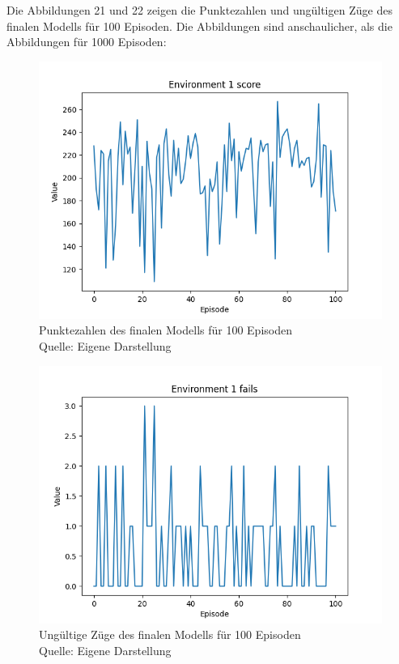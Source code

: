Die Abbildungen 21 und 22 zeigen die Punktezahlen und ungültigen Züge des finalen Modells für 100 Episoden. Die Abbildungen sind anschaulicher, als die Abbildungen für 1000 Episoden:
\nopagebreak
\begin{figure}[H]
	\includegraphics[width=1\textwidth]{Bilder/final4000steps} 
	\caption[Punktezahlen des finalen Modells für 100 Episoden]{Punktezahlen des finalen Modells für 100 Episoden\\ Quelle: Eigene Darstellung}
\end{figure}
\begin{figure}[H]
	\includegraphics[width=1\textwidth]{Bilder/final4000stepsf} 
	\caption[Ungültige Züge des finalen Modells für 100 Episoden]{Ungültige Züge des finalen Modells für 100 Episoden\\ Quelle: Eigene Darstellung}
\end{figure}
